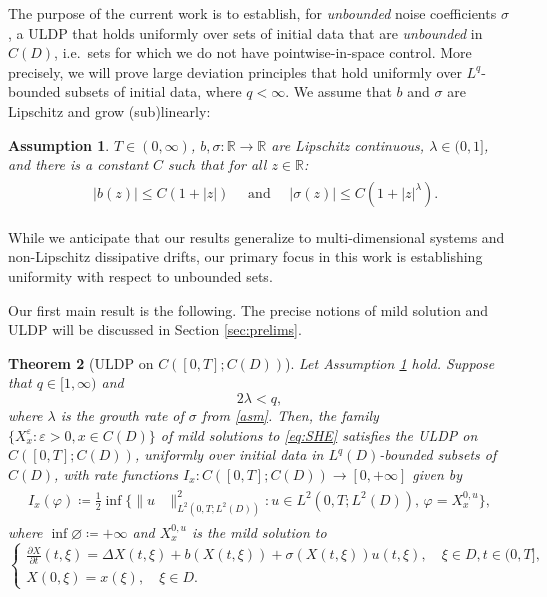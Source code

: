 \documentclass[10pt,a4paper]{amsart}
\newtheorem{theorem}{Theorem}[section]
\newtheorem{assumption}[theorem]{Assumption}
\numberwithin{equation}{section}
\newcommand{\R}{\mathbb{R}}
\newcommand{\ceqq}{\coloneqq}
\newcommand{\col}{\colon}
\newcommand{\eps}{\varepsilon}
\begin{document}
 The purpose of the current work is to establish, for \emph{unbounded} noise coefficients $\sigma$, a ULDP that holds uniformly over sets of initial data that are \emph{unbounded} in $C(D)$, i.e.\ sets for which we do not have pointwise-in-space control. 
More precisely, we will prove large deviation principles that hold uniformly over $L^q$-bounded subsets of initial data, where $q<\infty$. We assume that  $b$ and $\sigma$ are Lipschitz and grow (sub)linearly:  
\begin{assumption}\label{asm}
$T\in(0,\infty)$, $b,\sigma\col  \R\to \R$ are Lipschitz continuous, $\lambda\in(0,1]$, and there is a constant $C$ such that for all  $z\in \R$:
\begin{align}\label{eq:growth}
\begin{split}
  &|b(z)|\leq C(1+|z|)\quad \text{ and }\quad |\sigma(z)|\leq C(1+|z|^\lambda).
\end{split}
\end{align}
\end{assumption}
While we anticipate that our results generalize to multi-dimensional systems and non-Lipschitz dissipative drifts, our primary focus in this work is establishing uniformity with respect to unbounded sets. 
 

Our first main result is the following. The precise notions of mild solution and ULDP will be discussed in Section \ref{sec:prelims}.  
 

\begin{theorem}[{ULDP on $C([0,T];C(D))$}]\label{th:C} Let Assumption \ref{asm} hold.  Suppose that $q\in[1,\infty)$ and  
\begin{equation*} 
2\lambda<q, 
\end{equation*}
where $\lambda$ is the growth rate of $\sigma$ from \eqref{asm}. 
Then, the family $\{X_x^{\eps}:\eps>0,x\in C(D)\}$ of mild solutions to \eqref{eq:SHE} satisfies the ULDP on $C([0,T];C(D))$, uniformly over initial data in $L^q(D)$-bounded subsets of $C(D)$, with rate functions $I_x\col C([0,T];C(D))\to [0,+\infty]$ given by 
\begin{align}\label{eq:rate}
\begin{split}
I_x(\varphi)\ceqq \frac12\inf\{\|u&\|_{L^2(0,T;L^2(D))}^2 :     u\in L^2(0,T;L^2(D)),\,\varphi=X_x^{0,u}\}, 
\end{split}
\end{align}
where $\inf\varnothing\ceqq +\infty$ and $X_x^{0,u}$ is the mild solution to 
\begin{equation*} 
\begin{cases}
\frac{\partial X}{\partial t}(t, \xi) = \Delta X(t, \xi) +b(X(t,\xi))+ \sigma(X(t, \xi))u(t,\xi), \quad  \xi \in D, t \in(0,T], \\ 
X(0, \xi) = x(\xi), \quad\xi\in D.
\end{cases} 
\end{equation*}  
\end{theorem}
\end{document}
